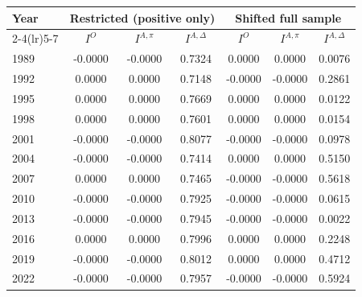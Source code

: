 \begin{tabular}{lcccccc}
\toprule
Year & \multicolumn{3}{c}{Restricted (positive only)} & \multicolumn{3}{c}{Shifted full sample} \\
\cmidrule(lr){2-4}\cmidrule(lr){5-7}
& $I^{O}$ & $I^{A,\pi}$ & $I^{A,\Delta}$ & $I^{O}$ & $I^{A,\pi}$ & $I^{A,\Delta}$ \\
\midrule
1989 & -0.0000 & -0.0000 & 0.7324 & 0.0000 & 0.0000 & 0.0076 \\
1992 & 0.0000 & 0.0000 & 0.7148 & -0.0000 & -0.0000 & 0.2861 \\
1995 & 0.0000 & 0.0000 & 0.7669 & 0.0000 & 0.0000 & 0.0122 \\
1998 & 0.0000 & 0.0000 & 0.7601 & 0.0000 & 0.0000 & 0.0154 \\
2001 & -0.0000 & -0.0000 & 0.8077 & -0.0000 & -0.0000 & 0.0978 \\
2004 & -0.0000 & -0.0000 & 0.7414 & 0.0000 & 0.0000 & 0.5150 \\
2007 & 0.0000 & 0.0000 & 0.7465 & -0.0000 & -0.0000 & 0.5618 \\
2010 & -0.0000 & -0.0000 & 0.7925 & -0.0000 & -0.0000 & 0.0615 \\
2013 & -0.0000 & -0.0000 & 0.7945 & -0.0000 & -0.0000 & 0.0022 \\
2016 & 0.0000 & 0.0000 & 0.7996 & 0.0000 & 0.0000 & 0.2248 \\
2019 & -0.0000 & -0.0000 & 0.8012 & 0.0000 & 0.0000 & 0.4712 \\
2022 & -0.0000 & -0.0000 & 0.7957 & -0.0000 & -0.0000 & 0.5924 \\
\bottomrule
\end{tabular}

